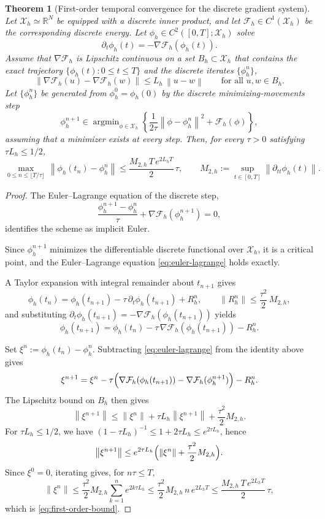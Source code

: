 \documentclass[10pt,a4paper]{amsart}
\newtheorem{theorem}{Theorem}
\newcommand{\E}{\mathcal{F}}
\newcommand{\X}{\mathcal{X}}
\newcommand{\argmin}{\mathop{\mathrm{argmin}}}
\newcommand{\grad}{\nabla}%
\newcommand{\norm}[1]{\left\| #1 \right\|}
\newcommand{\ph}{\phi}%
\begin{document}
\begin{theorem}[First-order temporal convergence for the discrete gradient system]
\label{thm:first_order}
Let $\X_h\simeq\mathbb{R}^N$ be equipped with a discrete inner product, and let $\E_h\in C^1(\X_h)$ be the corresponding discrete energy. Let $\ph_h\in C^2([0,T];\X_h)$ solve
\[
\partial_t\phi_h(t)=-\grad\E_h(\phi_h(t)).
\]
Assume that $\grad\E_h$ is Lipschitz continuous on a set $B_h\subset\X_h$ that contains the exact trajectory $\{\phi_h(t):0\le t\le T\}$ and the discrete iterates $\{\phi_h^n\}$,
\[
\norm{\grad\E_h(u)-\grad\E_h(w)} \le L_h\,\norm{u-w}
\qquad \text{for all } u,w\in B_h.
\]
Let $\{\phi_h^n\}$ be generated from $\phi_h^0=\phi_h(0)$ by the discrete minimizing-movements step
\[
\phi_h^{n+1}\in
\argmin_{\phi\in\X_h}
\left\{
\frac{1}{2\tau}\norm{\phi-\phi_h^n}^2+\E_h(\phi)
\right\},
\]
assuming that a minimizer exists at every step. Then, for every $\tau>0$ satisfying $\tau L_h\le 1/2$,
\begin{equation}
\max_{0\le n\le \lfloor T/\tau\rfloor}\,
\norm{\phi_h(t_n)-\phi_h^n}
\le
\frac{M_{2,h}\,T\,e^{2L_hT}}{2}\,\tau,
\qquad
M_{2,h}:=\sup_{t\in[0,T]}\norm{\partial_{tt}\phi_h(t)} .
\label{eq:first-order-bound}
\end{equation}
\end{theorem}

\begin{proof}

The Euler--Lagrange equation of the discrete step,
\begin{equation}
\frac{\phi_h^{n+1}-\phi_h^n}{\tau}
+\grad\E_h(\phi_h^{n+1})=0,
\label{eq:euler-lagrange}
\end{equation}
identifies the scheme as implicit Euler.

Since $\phi_h^{n+1}$ minimizes the differentiable discrete functional over $\X_h$, it is a critical point, and the Euler--Lagrange equation \eqref{eq:euler-lagrange} holds exactly.

A Taylor expansion with integral remainder about $t_{n+1}$ gives
\[
\phi_h(t_n)=\phi_h(t_{n+1})-\tau\,\partial_t\phi_h(t_{n+1})+R_h^n,
\qquad
\norm{R_h^n}\le\frac{\tau^2}{2}\,M_{2,h},
\]
and substituting $\partial_t\phi_h(t_{n+1})=-\grad\E_h(\phi_h(t_{n+1}))$ yields
\[
\phi_h(t_{n+1})
=
\phi_h(t_n)-\tau\,\grad\E_h(\phi_h(t_{n+1}))-R_h^n .
\]

Set $\xi^n:=\phi_h(t_n)-\phi_h^n$. Subtracting \eqref{eq:euler-lagrange} from the identity above gives
\[
\xi^{n+1}
=
\xi^n
-\tau\Bigl(\grad\E_h(\phi_h(t_{n+1}))
-\grad\E_h(\phi_h^{n+1})\Bigr)
-R_h^n .
\]
The Lipschitz bound on $B_h$ then gives
\[
\norm{\xi^{n+1}}
\le
\norm{\xi^n}+\tau L_h\norm{\xi^{n+1}}
+\frac{\tau^2}{2}M_{2,h}.
\]
For $\tau L_h\le 1/2$, we have $(1-\tau L_h)^{-1}\le 1+2\tau L_h\le e^{2\tau L_h}$, hence
\[
\norm{\xi^{n+1}}
\le
e^{2\tau L_h}
\Bigl(\norm{\xi^n}+\frac{\tau^2}{2}M_{2,h}\Bigr).
\]
Since $\xi^0=0$, iterating gives, for $n\tau\le T$,
\[
\norm{\xi^n}
\le
\frac{\tau^2}{2}M_{2,h}\sum_{k=1}^{n} e^{2k\tau L_h}
\le
\frac{\tau^2}{2}M_{2,h}\,n\,e^{2L_hT}
\le
\frac{M_{2,h}\,T\,e^{2L_hT}}{2}\,\tau,
\]
which is \eqref{eq:first-order-bound}.
\end{proof}
\end{document}
